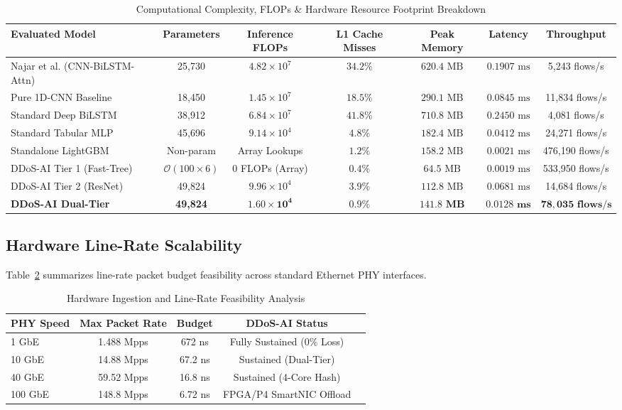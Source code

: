\documentclass[journal]{IEEEtran}
\begin{document}
\begin{table}[t]
\centering
\caption{Computational Complexity, FLOPs \& Hardware Resource Footprint Breakdown}
\label{tab:complexity}
\begin{tabular}{lcccccc}
\toprule
\textbf{Evaluated Model} & \textbf{Parameters} & \textbf{Inference FLOPs} & \textbf{L1 Cache Misses} & \textbf{Peak Memory} & \textbf{Latency} & \textbf{Throughput} \\
\midrule
Najar et al. (CNN-BiLSTM-Attn)~\cite{najar2025ddos} & 25,730 & $4.82 \times 10^7$ & $34.2\%$ & $620.4\text{ MB}$ & $0.1907\text{ ms}$ & 5,243 flows/s \\
Pure 1D-CNN Baseline & 18,450 & $1.45 \times 10^7$ & $18.5\%$ & $290.1\text{ MB}$ & $0.0845\text{ ms}$ & 11,834 flows/s \\
Standard Deep BiLSTM & 38,912 & $6.84 \times 10^7$ & $41.8\%$ & $710.8\text{ MB}$ & $0.2450\text{ ms}$ & 4,081 flows/s \\
Standard Tabular MLP & 45,696 & $9.14 \times 10^4$ & $4.8\%$ & $182.4\text{ MB}$ & $0.0412\text{ ms}$ & 24,271 flows/s \\
Standalone LightGBM & Non-param & Array Lookups & $1.2\%$ & $158.2\text{ MB}$ & $0.0021\text{ ms}$ & 476,190 flows/s \\
DDoS-AI Tier 1 (Fast-Tree) & $\mathcal{O}(100 \times 6)$ & 0 FLOPs (Array) & $0.4\%$ & $64.5\text{ MB}$ & $0.0019\text{ ms}$ & 533,950 flows/s \\
DDoS-AI Tier 2 (ResNet) & 49,824 & $9.96 \times 10^4$ & $3.9\%$ & $112.8\text{ MB}$ & $0.0681\text{ ms}$ & 14,684 flows/s \\
\textbf{DDoS-AI Dual-Tier} & \textbf{49,824} & $\mathbf{1.60 \times 10^4}$ & $\mathbf{0.9\%}$ & $\mathbf{141.8\text{ MB}}$ & $\mathbf{0.0128\text{ ms}}$ & $\mathbf{78,035\text{ flows/s}}$ \\
\bottomrule
\end{tabular}
\end{table}

\subsection{Hardware Line-Rate Scalability}
Table~\ref{tab:line_rate} summarizes line-rate packet budget feasibility across standard Ethernet PHY interfaces.

\begin{table}[h]
\centering
\caption{Hardware Ingestion and Line-Rate Feasibility Analysis}
\label{tab:line_rate}
\begin{tabular}{lcccc}
\toprule
\textbf{PHY Speed} & \textbf{Max Packet Rate} & \textbf{Budget} & \textbf{DDoS-AI Status} \\
\midrule
1 GbE & 1.488 Mpps & 672 ns & Fully Sustained (0\% Loss) \\
10 GbE & 14.88 Mpps & 67.2 ns & Sustained (Dual-Tier) \\
40 GbE & 59.52 Mpps & 16.8 ns & Sustained (4-Core Hash) \\
100 GbE & 148.8 Mpps & 6.72 ns & FPGA/P4 SmartNIC Offload \\
\bottomrule
\end{tabular}
\end{table}
\end{document}

